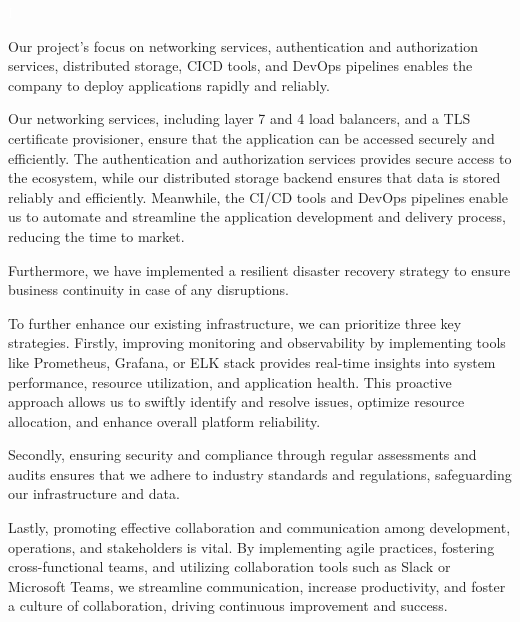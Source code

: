 \fancyhead[R]{\ungaramond\small\textbf{}}
\textcolor{white}{I} %

\begin{center}

\end{center}

\hspace{7mm}Our project's focus on networking services, authentication and authorization services, distributed storage, CICD tools, and DevOps pipelines enables the company to deploy applications rapidly and reliably.

\hspace{7mm}Our networking services, including layer 7 and 4 load balancers, and a TLS certificate provisioner, ensure that the application can be accessed securely and efficiently. The authentication and authorization services provides secure access to the ecosystem, while our distributed storage backend ensures that data is stored reliably and efficiently. Meanwhile, the CI/CD tools and DevOps pipelines enable us to automate and streamline the application development and delivery process, reducing the time to market. 

\hspace{7mm}Furthermore, we have implemented a resilient disaster recovery strategy to ensure business continuity in case of any disruptions.

\hspace{7mm}To further enhance our existing infrastructure, we can prioritize three key strategies. Firstly, improving monitoring and observability by implementing tools like Prometheus, Grafana, or ELK stack provides real-time insights into system performance, resource utilization, and application health. This proactive approach allows us to swiftly identify and resolve issues, optimize resource allocation, and enhance overall platform reliability.

\hspace{7mm}Secondly, ensuring security and compliance through regular assessments and audits ensures that we adhere to industry standards and regulations, safeguarding our infrastructure and data.

\hspace{7mm}Lastly, promoting effective collaboration and communication among development, operations, and stakeholders is vital. By implementing agile practices, fostering cross-functional teams, and utilizing collaboration tools such as Slack or Microsoft Teams, we streamline communication, increase productivity, and foster a culture of collaboration, driving continuous improvement and success.

